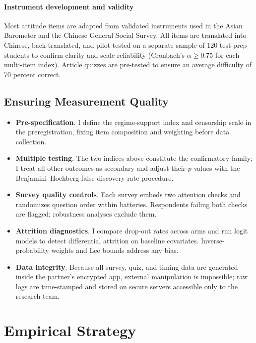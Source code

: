 \documentclass[12pt, american]{article}
\begin{document}
\paragraph{Instrument development and validity}

Most attitude items are adapted from validated instruments used in the Asian Barometer and the Chinese General Social Survey.  All items are translated into Chinese, back-translated, and pilot-tested on a separate sample of 120 test-prep students to confirm clarity and scale reliability (Cronbach’s $\alpha \ge 0.75$ for each multi-item index).  Article quizzes are pre-tested to ensure an average difficulty of 70 percent correct.

\subsection{Ensuring Measurement Quality}

\begin{itemize}
    \item \textbf{Pre-specification}.  I define the regime-support index and censorship scale in the preregistration, fixing item composition and weighting before data collection.
    \item \textbf{Multiple testing}.  The two indices above constitute the confirmatory family; I treat all other outcomes as secondary and adjust their $p$-values with the Benjamini–Hochberg false-discovery-rate procedure.
    \item \textbf{Survey quality controls}.  Each survey embeds two attention checks and randomizes question order within batteries.  Respondents failing both checks are flagged; robustness analyses exclude them.
    \item \textbf{Attrition diagnostics}.  I compare drop-out rates across arms and run logit models to detect differential attrition on baseline covariates.  Inverse-probability weights and Lee bounds address any bias.
    \item \textbf{Data integrity}.  Because all survey, quiz, and timing data are generated inside the partner’s encrypted app, external manipulation is impossible; raw logs are time-stamped and stored on secure servers accessible only to the research team.
\end{itemize}


\section{Empirical Strategy}
\end{document}
